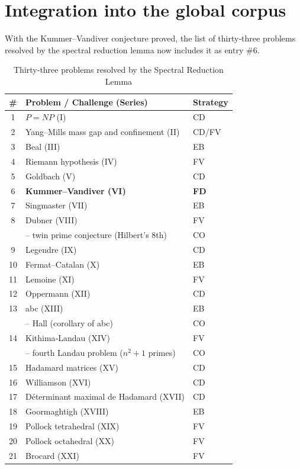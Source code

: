 \documentclass[11pt,a4paper]{article}
\begin{document}
\section{Integration into the global corpus}

With the Kummer–Vandiver conjecture proved, the list of thirty‑three problems resolved by the spectral reduction lemma now includes it as entry \#6.

\begin{center}
\small
\begin{longtable}{@{}cll@{}}
\caption{Thirty‑three problems resolved by the Spectral Reduction Lemma}\\
\toprule
\# & Problem / Challenge (Series) & Strategy \\
\midrule
1 & \(P = NP\) (I) & CD \\
2 & Yang–Mills mass gap and confinement (II) & CD/FV \\
3 & Beal (III) & EB \\
4 & Riemann hypothesis (IV) & FV \\
5 & Goldbach (V) & CD \\
6 & \textbf{Kummer–Vandiver (VI)} & \textbf{FD} \\
7 & Singmaster (VII) & EB \\
8 & Dubner (VIII) & FV \\
   & \quad – twin prime conjecture (Hilbert's 8th) & CO \\
9 & Legendre (IX) & CD \\
10 & Fermat–Catalan (X) & EB \\
11 & Lemoine (XI) & FV \\
12 & Oppermann (XII) & CD \\
13 & abc (XIII) & EB \\
   & \quad – Hall (corollary of abc) & CO \\
14 & Kithima‑Landau (XIV) & FV \\
    & \quad – fourth Landau problem (\(n^2+1\) primes) & CO \\
15 & Hadamard matrices (XV) & CD \\
16 & Williamson (XVI) & CD \\
17 & Déterminant maximal de Hadamard (XVII) & CD \\
18 & Goormaghtigh (XVIII) & EB \\
19 & Pollock tetrahedral (XIX) & FV \\
20 & Pollock octahedral (XX) & FV \\
21 & Brocard (XXI) & FV \\

\end{longtable}
\end{center}
\end{document}

